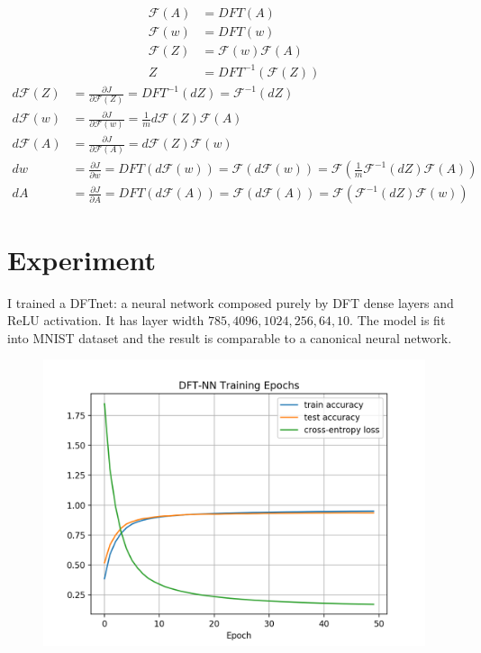 \documentclass[12pt]{article}
\begin{document}
\begin{align*}
	\mathscr{F}(A) &= DFT(A) \\
	\mathscr{F}(w) &= DFT(w) \\
	\mathscr{F}(Z) &= \mathscr{F}(w) \mathscr{F}(A) \\
	Z &= DFT^{-1}(\mathscr{F}(Z))
\end{align*}
\begin{align*}
	d\mathscr{F}(Z) &= \frac{\partial{J}}{\partial{\mathscr{F}(Z)}} = DFT^{-1}(dZ) = \mathscr{F}^{-1}(dZ) \\
	d\mathscr{F}(w) &= \frac{\partial{J}}{\partial{\mathscr{F}(w)}} = \frac{1}{m} d\mathscr{F}(Z) \mathscr{F}(A) \\
	d\mathscr{F}(A) &= \frac{\partial{J}}{\partial{\mathscr{F}(A)}} = d\mathscr{F}(Z) \mathscr{F}(w) \\
	dw &= \frac{\partial{J}}{\partial{w}} = DFT(d\mathscr{F}(w)) = \mathscr{F}(d\mathscr{F}(w)) = \mathscr{F}(\frac{1}{m} \mathscr{F}^{-1}(dZ) \mathscr{F}(A)) \\
	dA &= \frac{\partial{J}}{\partial{A}} = DFT(d\mathscr{F}(A)) = \mathscr{F}(d\mathscr{F}(A)) = \mathscr{F}(\mathscr{F}^{-1}(dZ) \mathscr{F}(w))
\end{align*}

\section{Experiment}

I trained a DFTnet: a neural network composed purely by DFT dense layers and ReLU activation. It has layer width $785, 4096, 1024, 256, 64, 10$. The model is fit into MNIST dataset and the result is comparable to a canonical neural network. 
\begin{figure}[h]
	\centering
	\includegraphics[scale=0.8]{fig.png}
\end{figure}

\end{document}
